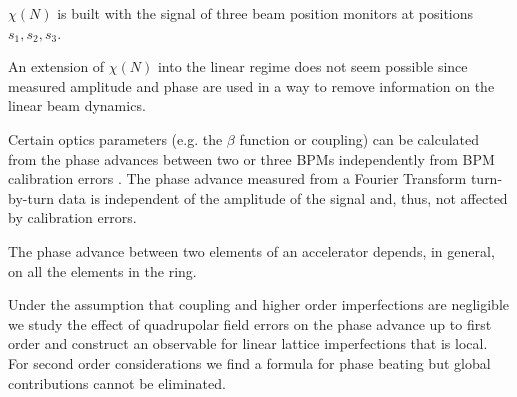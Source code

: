 $\chi (N)$ is built with the signal of three beam position monitors at positions $s_1, s_2, s_3$.

An extension of $\chi(N)$ into the linear regime does not seem possible since measured amplitude
and phase are used in a way to remove information on the linear beam dynamics.

Certain optics parameters (e.g. the $\beta$ function or coupling) can be calculated from the phase
advances between two or three BPMs \cite{Franchi2010, Miyamoto2010, Castro1996}
independently from BPM calibration errors \cite{Calaga2007}. 
The phase advance measured from a Fourier Transform \cite{Guo2016} turn-by-turn data is independent of the amplitude
of the signal and, thus, not affected by calibration errors.


The phase advance between two elements of an accelerator depends, in general, on all the elements in
the ring.


Under the assumption that coupling and higher order imperfections are negligible we
study the effect of quadrupolar field errors on the phase advance up to first order and construct an observable for
linear lattice imperfections that is local. For second order considerations we find a formula
for phase beating but global contributions cannot be eliminated.

